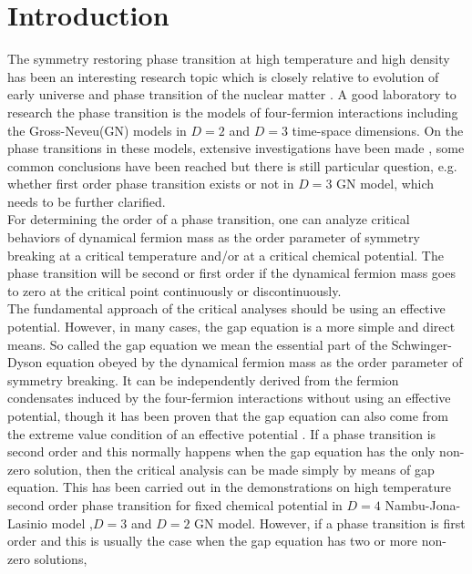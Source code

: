 \documentclass[a4paper,eqsecnum]{revtex4}
\begin{document}
\section{Introduction\label{sec:intro}}
The symmetry restoring phase transition at high temperature and high density has been 
an interesting research topic which is closely relative to evolution of early universe 
and phase transition of the nuclear matter \cite{kn:1,kn:2,kn:3,kn:4}. A good 
laboratory to research the phase transition is the models of four-fermion 
interactions including the Gross-Neveu(GN) models in $D=2$ and $D=3$ \cite{kn:5} 
time-space dimensions. On the phase transitions in these models, extensive 
investigations have been made \cite{kn:6,kn:7,kn:8,kn:9, kn:10, kn:11, kn:12, kn:13}, 
some common conclusions have been reached  but there is still particular question, 
e.g. whether first order phase transition exists or not in $D=3$ GN model, which needs 
to be further clarified. \\
\indent For determining the order of a phase transition, one can analyze critical 
behaviors of dynamical fermion mass as the order parameter of symmetry breaking at 
a critical temperature and/or at a critical chemical potential. The phase transition 
will be second or first order if the dynamical fermion mass goes to zero at the critical 
point continuously or discontinuously. \\
\indent The fundamental approach of the critical analyses should be using an effective 
potential. However, in many cases, the gap equation is a more simple and direct means. 
So called the gap equation we mean the essential part of the Schwinger-Dyson equation 
obeyed  by the dynamical fermion mass as the order parameter of symmetry breaking. 
It can be independently derived from the fermion condensates induced by the 
four-fermion interactions without using an effective potential, though it has 
been proven that the gap equation can also come from the extreme value condition of 
an effective potential \cite{kn:14}. If a phase transition is second order and this 
normally happens when the gap equation has the only non-zero solution, then the 
critical analysis can be made simply by means of gap equation. This has been carried 
out in the demonstrations on high temperature second order phase transition for fixed 
chemical potential in $D=4$ Nambu-Jona-Lasinio model \cite{kn:15},$D=3$ \cite{kn:16} and $D=2$ \cite{kn:17} GN model. However, if a phase transition is first order and 
this is usually the case when the gap equation has two or more non-zero solutions, 
\end{document}
